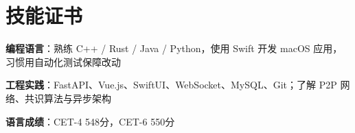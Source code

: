 \documentclass{cv}
\begin{document}
\section{技能证书}
\begin{compactlist}
  \item \textbf{编程语言}：熟练 C++ / Rust / Java / Python，使用 Swift 开发 macOS 应用，习惯用自动化测试保障改动
  \item \textbf{工程实践}：FastAPI、Vue.js、SwiftUI、WebSocket、MySQL、Git；了解 P2P 网络、共识算法与异步架构
  \item \textbf{语言成绩}：CET-4 548分，CET-6 550分
\end{compactlist}
\end{document}
